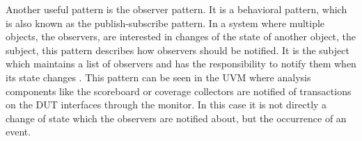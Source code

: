 \documentclass[11pt,a4paper]{report}
\begin{document}
Another useful pattern is the observer pattern. It is a behavioral pattern, which is also known as the
publish-subscribe pattern. In a system where multiple objects, the observers, are interested in changes of the state
of another object, the subject, this pattern describes how observers should be notified. It is the subject which
maintains a list of observers and has the responsibility to notify them when its state changes \cite[Ch.
5]{design_patterns}. This pattern can be seen in the UVM where analysis components like the scoreboard or coverage
collectors are notified of transactions on the DUT interfaces through the monitor. In this case it is not directly a
change of state which the observers are notified about, but the occurrence of an event.

\end{document}
